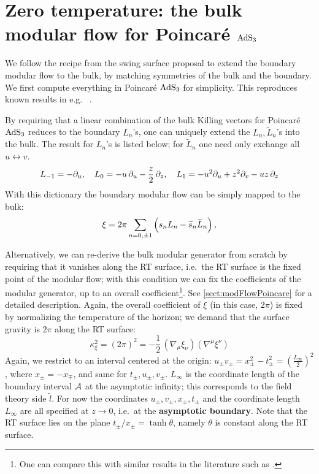 \documentclass[11pt,a4paper,utf8]{article}
\renewcommand{\tilde}[1]{\ensuremath{\widetilde{#1}}}
\begin{document}
	
\pagebreak
\section{Zero temperature: the bulk modular flow for Poincar\'e $\mathrm{AdS}_3$}
	
	We follow the recipe from the swing surface proposal \cite{Apolo:2020bld,Apolo:2020qjm} to extend the boundary modular flow to the bulk, by matching symmetries of the bulk and the boundary. 
	We first compute everything in Poincar\'e $\mathrm{AdS}_3$ for simplicity. 
	This reproduces known results in e.g.~\cite{Lashkari:2016idm,Czech:2019vih,Apolo:2020qjm} . 
	
	By requiring that a linear combination of the bulk Killing vectors for Poincar\'e $\mathrm{AdS}_3$ reduces to the boundary $L_n$'s, one can uniquely extend the $L_n,\tilde{L}_n$'s into the bulk. The result for $L_n$'s is listed below; for $\tilde{L}_n$ one need only exchange all $u\leftrightarrow v$.
	\begin{equation}
		L_{-1} = -\partial_{u},
	\quad
		L_0 = -u\,\partial_{u} - \frac{z}{2}\,\partial_{z},
	\quad
		L_1 = -u^2\partial_{u} + z^2 \partial_{v}
			- uz\,\partial_{z}
	\end{equation}
	With this dictionary the boundary modular flow can be simply mapped to the bulk:
	\begin{equation}
		\xi = 2\pi \sum_{n=0,\pm 1} \pqty{
				s_n L_n - \tilde{s}_n \tilde{L}_n
			},
	\end{equation}
	
	Alternatively, we can re-derive the bulk modular generator from scratch by requiring that it vanishes along the RT surface, i.e.~the RT surface is the fixed point of the modular flow; with this condition we can fix the coefficients of the modular generator, up to an overall coefficient\footnote{
		One can compare this with similar results in the literature such as \cite{Lashkari:2016idm,Czech:2019vih,Apolo:2020qjm}. 
	}. See \autoref{sect:modFlowPoincare} for a detailed description. 
	Again, the overall coefficient of $\xi$ (in this case, $2\pi$) is fixed by normalizing the temperature of the horizon; we demand that the surface gravity is $2\pi$ along the RT surface:
	\begin{equation}
		\kappa_\xi^2
		= (2\pi)^2
		= -\frac{1}{2}\,
			(\nabla_{\mu} \xi_{\nu})
			(\nabla^{\mu} \xi^{\nu})
	\end{equation}
	Again, we restrict to an interval centered at the origin: $
		u_\pm v_\pm
		= x^2_\pm - t^2_\pm
		= (\frac{L_\infty}{2})^2
	$, where $x_\pm = -x_\mp$, and same for $t_\pm, u_\pm, v_\pm$. 
	$L_\infty$ is the coordinate length of the boundary interval $\mathcal{A}$ at the asymptotic infinity; this corresponds to the field theory side $\tilde{l}$. 
	For now the coordinates $u_\pm, v_\pm, x_\pm, t_\pm$ and the coordinate length $L_\infty$ are all specified at $z\to 0$, i.e.~at the \textbf{asymptotic boundary}. Note that the RT surface lies on the plane $
		t_\pm / x_\pm = \tanh \theta
	$, namely $\theta$ is constant along the RT surface. 
	
\end{document}
